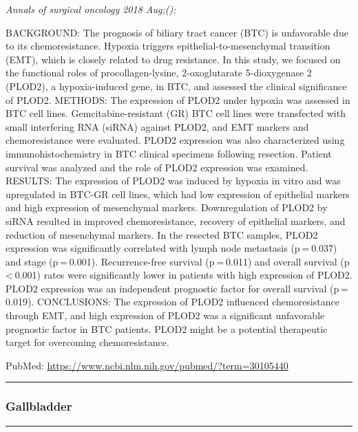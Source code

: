 \documentclass[]{article}
\begin{document}
\emph{Annals of surgical oncology 2018 Aug;():}

BACKGROUND: The prognosis of biliary tract cancer (BTC) is unfavorable
due to its chemoresistance. Hypoxia triggers epithelial-to-mesenchymal
transition (EMT), which is closely related to drug resistance. In this
study, we focused on the functional roles of procollagen-lysine,
2-oxoglutarate 5-dioxygenase 2 (PLOD2), a hypoxia-induced gene, in BTC,
and assessed the clinical significance of PLOD2. METHODS: The expression
of PLOD2 under hypoxia was assessed in BTC cell lines.
Gemcitabine-resistant (GR) BTC cell lines were transfected with small
interfering RNA (siRNA) against PLOD2, and EMT markers and
chemoresistance were evaluated. PLOD2 expression was also characterized
using immunohistochemistry in BTC clinical specimens following
resection. Patient survival was analyzed and the role of PLOD2
expression was examined. RESULTS: The expression of PLOD2 was induced by
hypoxia in vitro and was upregulated in BTC-GR cell lines, which had low
expression of epithelial markers and high expression of mesenchymal
markers. Downregulation of PLOD2 by siRNA resulted in improved
chemoresistance, recovery of epithelial markers, and reduction of
mesenchymal markers. In the resected BTC samples, PLOD2 expression was
significantly correlated with lymph node metastasis (p = 0.037) and
stage (p = 0.001). Recurrence-free survival (p = 0.011) and overall
survival (p \textless{} 0.001) rates were significantly lower in
patients with high expression of PLOD2. PLOD2 expression was an
independent prognostic factor for overall survival (p = 0.019).
CONCLUSIONS: The expression of PLOD2 influenced chemoresistance through
EMT, and high expression of PLOD2 was a significant unfavorable
prognostic factor in BTC patients. PLOD2 might be a potential
therapeutic target for overcoming chemoresistance.

PubMed: \url{https://www.ncbi.nlm.nih.gov/pubmed/?term=30105440}

{}

{}

\begin{center}\rule{0.5\linewidth}{\linethickness}\end{center}

\hypertarget{gallbladder-2}{%
\subsubsection{Gallbladder}\label{gallbladder-2}}

\begin{center}\rule{0.5\linewidth}{\linethickness}\end{center}
\end{document}
